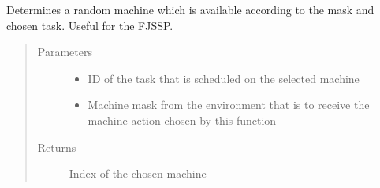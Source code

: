 \documentclass[letterpaper,10pt,english]{sphinxmanual}
\begin{document}
\begin{fulllineitems}
\label{\detokenize{agents.heuristic:agents.heuristic.heuristic_agent.choose_random_machine}}
\sphinxAtStartPar
Determines a random machine which is available according to the mask and chosen task. Useful for the FJSSP.
\begin{quote}\begin{description}
\item[{Parameters}] \leavevmode\begin{itemize}
\item {} 
\sphinxAtStartPar
{} \textendash{} ID of the task that is scheduled on the selected machine

\item {} 
\sphinxAtStartPar
{} \textendash{} Machine mask from the environment that is to receive the machine action chosen by this function

\end{itemize}

\item[{Returns}] \leavevmode
\sphinxAtStartPar
Index of the chosen machine

\end{description}\end{quote}

\end{fulllineitems}

\end{document}
